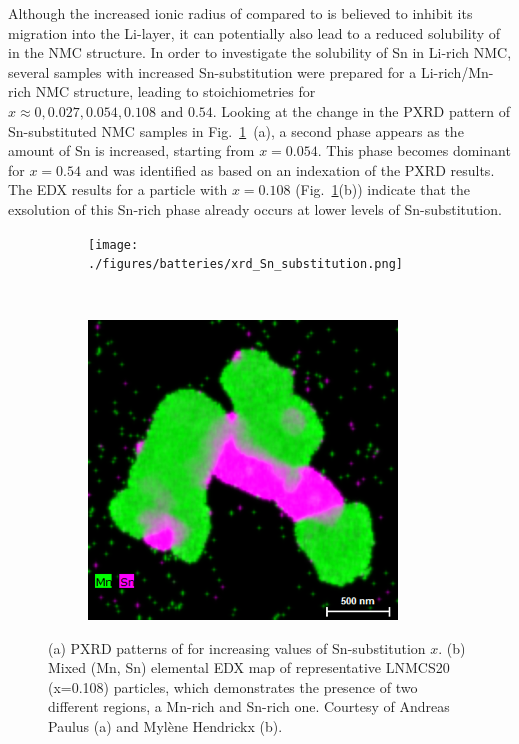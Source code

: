 \begin{refsection}
Although the increased ionic radius of  compared to  
is believed to inhibit its migration into the Li-layer, it can potentially 
also lead to a reduced solubility of  in the \gls{NMC} structure. In order to 
investigate the solubility of Sn in Li-rich \gls{NMC}, several samples with 
increased Sn-substitution were prepared for a Li-rich/Mn-rich \gls{NMC} structure, 
leading to stoichiometries  
for $x  \approx 0, 0.027, 0.054, 0.108 \textrm{ and } 0.54$. Looking at the 
change in the \gls{PXRD} pattern of Sn-substituted \gls{NMC} samples in 
Fig.~\ref{batteries:fig-Sn_experiment}~(a), a second phase appears as the 
amount of Sn is increased, starting from $x = 0.054$. This phase becomes dominant for $x=0.54$ and was 
identified as  based on an indexation of the \gls{PXRD} results. 
The \gls{EDX} results for a particle with $x=0.108$ 
(Fig.~\ref{batteries:fig-Sn_experiment}(b)) indicate that the exsolution of this 
Sn-rich phase already occurs at lower levels of Sn-substitution. 
 
\begin{figure}[ht] 
    \centering
    \captionsetup{width=0.92\linewidth}
    \begin{subfigure}[t]{0.65\textwidth} 
        \centering 
        \texttt{[image: ./figures/batteries/xrd\_Sn\_substitution.png]} 
        \caption{} 
    \end{subfigure}%
    ~  
    \begin{subfigure}[t]{0.34\textwidth} 
        \centering 
        \includegraphics[width=0.9\textwidth]{./figures/batteries/edx_Sn_substitution.png} 
        \caption{} 
    \end{subfigure} 
    \caption{(a) \gls{PXRD} patterns of 
 for increasing values of 
Sn-substitution $x$. (b) Mixed (Mn, Sn) elemental \gls{EDX} map of representative 
LNMCS20 (x=0.108) particles, which demonstrates the presence of two different regions, a Mn-rich and Sn-rich one. Courtesy of Andreas Paulus (a) and Myl\`ene 
Hendrickx (b).} 
    \label{batteries:fig-Sn_experiment} 
\end{figure} 
 

\end{refsection}
